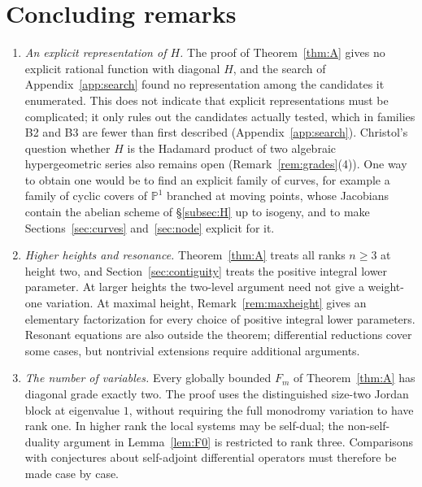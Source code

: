 \documentclass[11pt]{amsart}
\theoremstyle{definition}
\theoremstyle{remark}
\numberwithin{equation}{section}
\newcommand{\PP}{\mathbb{P}}
\begin{document}
\section{Concluding remarks}\label{sec:remarks}

\begin{enumerate}[label=(\arabic*),leftmargin=2em]
\item \emph{An explicit representation of $H$.} The proof of Theorem~\ref{thm:A} gives no explicit rational function with diagonal $H$, and the search of Appendix~\ref{app:search} found no representation among the candidates it enumerated. This does not indicate that explicit representations must be complicated; it only rules out the candidates actually tested, which in families B2 and B3 are fewer than first described (Appendix~\ref{app:search}). Christol's question whether $H$ is the Hadamard product of two algebraic hypergeometric series also remains open (Remark~\ref{rem:grades}(4)). One way to obtain one would be to find an explicit family of curves, for example a family of cyclic covers of $\PP^1$ branched at moving points, whose Jacobians contain the abelian scheme of \S\ref{subsec:H} up to isogeny, and to make Sections~\ref{sec:curves} and~\ref{sec:node} explicit for it.
\item \emph{Higher heights and resonance.} Theorem~\ref{thm:A} treats all ranks $n\ge3$ at height two, and Section~\ref{sec:contiguity} treats the positive integral lower parameter. At larger heights the two-level argument need not give a weight-one variation. At maximal height, Remark~\ref{rem:maxheight} gives an elementary factorization for every choice of positive integral lower parameters. Resonant equations are also outside the theorem; differential reductions cover some cases, but nontrivial extensions require additional arguments.
\item \emph{The number of variables.} Every globally bounded $F_m$ of Theorem~\ref{thm:A} has diagonal grade exactly two. The proof uses the distinguished size-two Jordan block at eigenvalue $1$, without requiring the full monodromy variation to have rank one. In higher rank the local systems may be self-dual; the non-self-duality argument in Lemma~\ref{lem:F0} is restricted to rank three. Comparisons with conjectures about self-adjoint differential operators \citep{HassaniMaillardZenine2025} must therefore be made case by case.



\end{enumerate}
\end{document}
